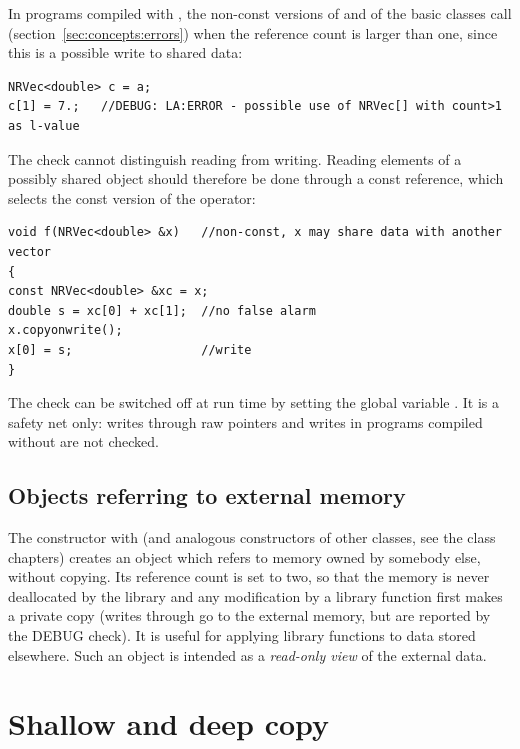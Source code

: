 In programs compiled with , the non-const versions of  and 
of the basic classes call  (section~\ref{sec:concepts:errors}) when the reference count is larger
than one, since this is a possible write to shared data:
\begin{lstlisting}
NRVec<double> c = a;
c[1] = 7.;   //DEBUG: LA:ERROR - possible use of NRVec[] with count>1 as l-value
\end{lstlisting}
The check cannot distinguish reading from writing. Reading elements of a possibly shared object should
therefore be done through a const reference, which selects the const version of the operator:
\begin{lstlisting}
void f(NRVec<double> &x)   //non-const, x may share data with another vector
{
const NRVec<double> &xc = x;
double s = xc[0] + xc[1];  //no false alarm
x.copyonwrite();
x[0] = s;                  //write
}
\end{lstlisting}
The check can be switched off at run time by setting the global variable .
It is a safety net only: writes through raw pointers and writes in programs compiled without 
are not checked.


\subsection{Objects referring to external memory}

The constructor  with  (and analogous
constructors of other classes, see the class chapters) creates an object which refers to memory owned by
somebody else, without copying. Its reference count is set to two, so that the memory is never deallocated by
the library and any modification by a library function first makes a private copy (writes through
 go to the external memory, but are reported by the DEBUG check). It is useful for applying
library functions to data stored elsewhere. Such an object is intended as a \emph{read-only view} of the external data.

\section{Shallow and deep copy}\label{sec:concepts:assign}

